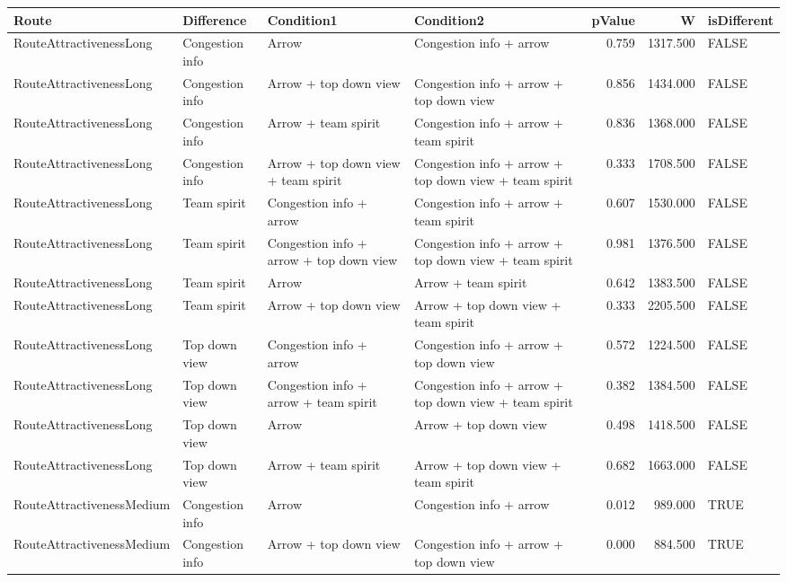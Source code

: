 \begin{tabular}{llllrrl}
  \hline
Route & Difference & Condition1 & Condition2 & pValue & W & isDifferent \\ 
  \hline
RouteAttractivenessLong & Congestion info & Arrow & Congestion info + arrow & 0.759 & 1317.500 & FALSE \\ 
  RouteAttractivenessLong & Congestion info & Arrow + top down view & Congestion info + arrow + top down view & 0.856 & 1434.000 & FALSE \\ 
  RouteAttractivenessLong & Congestion info & Arrow + team spirit & Congestion info + arrow + team spirit & 0.836 & 1368.000 & FALSE \\ 
  RouteAttractivenessLong & Congestion info & Arrow + top down view + team spirit & Congestion info + arrow + top down view + team spirit & 0.333 & 1708.500 & FALSE \\ 
  RouteAttractivenessLong & Team spirit & Congestion info + arrow & Congestion info + arrow + team spirit & 0.607 & 1530.000 & FALSE \\ 
  RouteAttractivenessLong & Team spirit & Congestion info + arrow + top down view & Congestion info + arrow + top down view + team spirit & 0.981 & 1376.500 & FALSE \\ 
  RouteAttractivenessLong & Team spirit & Arrow & Arrow + team spirit & 0.642 & 1383.500 & FALSE \\ 
  RouteAttractivenessLong & Team spirit & Arrow + top down view & Arrow + top down view + team spirit & 0.333 & 2205.500 & FALSE \\ 
  RouteAttractivenessLong & Top down view & Congestion info + arrow & Congestion info + arrow + top down view & 0.572 & 1224.500 & FALSE \\ 
  RouteAttractivenessLong & Top down view & Congestion info + arrow + team spirit & Congestion info + arrow + top down view + team spirit & 0.382 & 1384.500 & FALSE \\ 
  RouteAttractivenessLong & Top down view & Arrow & Arrow + top down view & 0.498 & 1418.500 & FALSE \\ 
  RouteAttractivenessLong & Top down view & Arrow + team spirit & Arrow + top down view + team spirit & 0.682 & 1663.000 & FALSE \\ 
  RouteAttractivenessMedium & Congestion info & Arrow & Congestion info + arrow & 0.012 & 989.000 & TRUE \\ 
  RouteAttractivenessMedium & Congestion info & Arrow + top down view & Congestion info + arrow + top down view & 0.000 & 884.500 & TRUE \\ 

\end{tabular}
